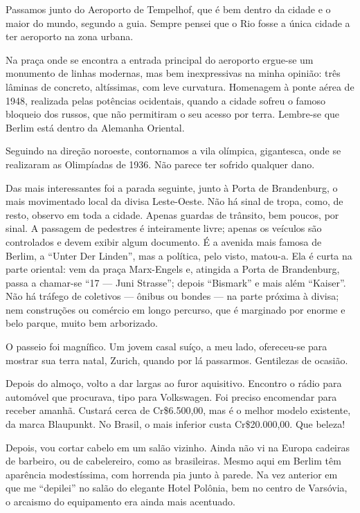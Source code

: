 Passamos junto do Aeroporto de Tempelhof, que é bem dentro da cidade e o maior do mundo, segundo a guia. Sempre pensei que o Rio fosse a única cidade a ter aeroporto na zona urbana.

Na praça onde se encontra a entrada principal do aeroporto ergue-se um monumento de linhas modernas, mas bem inexpressivas na minha opinião: três lâminas de concreto, altíssimas, com leve curvatura. Homenagem à ponte aérea de 1948, realizada pelas potências ocidentais, quando a cidade sofreu o famoso bloqueio dos russos, que não permitiram o seu acesso por terra. Lembre-se que Berlim está dentro da Alemanha Oriental.

Seguindo na direção noroeste, contornamos a vila olímpica, gigantesca, onde se realizaram as Olimpíadas de 1936. Não parece ter sofrido qualquer dano.

Das mais interessantes foi a parada seguinte, junto à Porta de Brandenburg, o mais movimentado local da divisa Leste-Oeste. Não há sinal de tropa, como, de resto, observo em toda a cidade. Apenas guardas de trânsito, bem poucos, por sinal. A passagem de pedestres é inteiramente livre; apenas os veículos são controlados e devem exibir algum documento. É a avenida mais famosa de Berlim, a ``Unter Der Linden'', mas a política, pelo visto, matou-a. Ela é curta na parte oriental: vem da praça Marx-Engels e, atingida a Porta de Brandenburg, passa a chamar-se ``17 --- Juni Strasse''; depois ``Bismark'' e mais além ``Kaiser''. Não há tráfego de coletivos --- ônibus ou bondes --- na parte próxima à divisa; nem construções ou comércio em longo percurso, que é marginado por enorme e belo parque, muito bem arborizado.

O passeio foi magnífico. Um jovem casal suíço, a meu lado, ofereceu-se para mostrar sua terra natal, Zurich, quando por lá passarmos. Gentilezas de ocasião.

Depois do almoço, volto a dar largas ao furor aquisitivo. Encontro o rádio para automóvel que procurava, tipo para Volkswagen. Foi preciso encomendar para receber amanhã. Custará cerca de Cr\$6.500,00, mas é o melhor modelo existente, da marca Blaupunkt. No Brasil, o mais inferior custa Cr\$20.000,00. Que beleza!

Depois, vou cortar cabelo em um salão vizinho. Ainda não vi na Europa cadeiras de barbeiro, ou de cabelereiro, como as brasileiras. Mesmo aqui em Berlim têm aparência modestíssima, com horrenda pia junto à parede. Na vez anterior em que me ``depilei'' no salão do elegante Hotel Polônia, bem no centro de Varsóvia, o arcaismo do equipamento era ainda mais acentuado.

